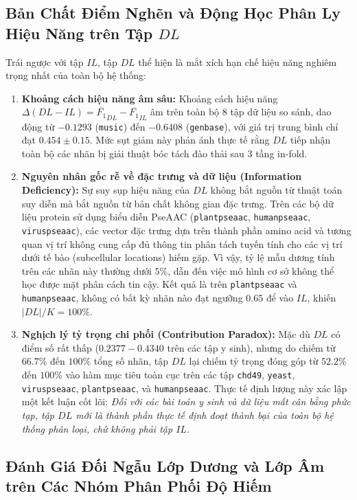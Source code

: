 \documentclass[10pt,a4paper]{article}
\begin{document}
\subsection{Bản Chất Điểm Nghẽn và Động Học Phân Ly Hiệu Năng trên Tập \texorpdfstring{$DL$}{DL}}
Trái ngược với tập $IL$, tập $DL$ thể hiện là mắt xích hạn chế hiệu năng nghiêm trọng nhất của toàn bộ hệ thống:
\begin{enumerate}[leftmargin=*]
    \item \textbf{Khoảng cách hiệu năng âm sâu:} Khoảng cách hiệu năng $\Delta(DL - IL) = \overline{F_1}_{DL} - \overline{F_1}_{IL}$ âm trên toàn bộ 8 tập dữ liệu so sánh, dao động từ $-0.1293$ (\texttt{music}) đến $-0.6408$ (\texttt{genbase}), với giá trị trung bình chỉ đạt $0.454 \pm 0.15$. Mức sụt giảm này phản ánh thực tế rằng $DL$ tiếp nhận toàn bộ các nhãn bị giải thuật bóc tách đào thải sau 3 tầng in-fold.
    \item \textbf{Nguyên nhân gốc rễ về đặc trưng và dữ liệu (Information Deficiency):} 
    Sự suy sụp hiệu năng của $DL$ không bắt nguồn từ thuật toán suy diễn mà bắt nguồn từ bản chất không gian đặc trưng. Trên các bộ dữ liệu protein sử dụng biểu diễn PseAAC (\texttt{plantpseaac}, \texttt{humanpseaac}, \texttt{viruspseaac}), các vector đặc trưng dựa trên thành phần amino acid và tương quan vị trí không cung cấp đủ thông tin phân tách tuyến tính cho các vị trí dưới tế bào (subcellular locations) hiếm gặp. Vì vậy, tỷ lệ mẫu dương tính trên các nhãn này thường dưới $5\%$, dẫn đến việc mô hình cơ sở không thể học được mặt phân cách tin cậy. Kết quả là trên \texttt{plantpseaac} và \texttt{humanpseaac}, không có bất kỳ nhãn nào đạt ngưỡng $0.65$ để vào $IL$, khiến $|DL|/K = 100\%$.
    \item \textbf{Nghịch lý tỷ trọng chi phối (Contribution Paradox):}
    Mặc dù $DL$ có điểm số rất thấp ($0.2377 - 0.4340$ trên các tập y sinh), nhưng do chiếm từ $66.7\%$ đến $100\%$ tổng số nhãn, tập $DL$ lại chiếm tỷ trọng đóng góp từ $52.2\%$ đến $100\%$ vào hàm mục tiêu toàn cục trên các tập \texttt{chd49}, \texttt{yeast}, \texttt{viruspseaac}, \texttt{plantpseaac}, và \texttt{humanpseaac}. 
    Thực tế định lượng này xác lập một kết luận cốt lõi: \textit{Đối với các bài toán y sinh và dữ liệu mất cân bằng phức tạp, tập $DL$ mới là thành phần thực tế định đoạt thành bại của toàn bộ hệ thống phân loại, chứ không phải tập $IL$.}
\end{enumerate}

\subsection{Đánh Giá Đối Ngẫu Lớp Dương và Lớp Âm trên Các Nhóm Phân Phối Độ Hiếm}
\end{document}
